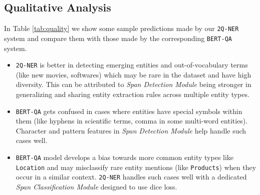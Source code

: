 \subsection{Qualitative Analysis}
In Table \ref{tab:quality} we show some sample predictions made by our \texttt{2Q-NER} system and compare them with those made by the corresponding \texttt{BERT-QA} system. 
\begin{itemize}
    \item \texttt{2Q-NER} is better in detecting emerging entities and out-of-vocabulary terms (like new movies, softwares) which may be rare in the dataset and have high diversity. This can be attributed to \textit{Span Detection Module} being stronger in generalizing and sharing entity extraction rules across multiple entity types.
    
    \item \texttt{BERT-QA} gets confused in cases where entities have special symbols within them (like hyphens in scientific terms, comma in some multi-word entities). Character and pattern features in \textit{Span Detection Module} help handle such cases well.
    
    \item \texttt{BERT-QA} model develops a bias towards more common entity types like \texttt{Location} and may misclassify rare entity mentions (like \texttt{Products}) when they occur in a similar context. \texttt{2Q-NER} handles such cases well with a dedicated \textit{Span Classification Module} designed to use dice loss.
\end{itemize}

